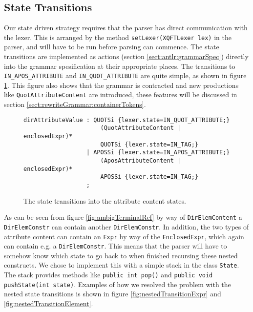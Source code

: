 \subsection{State Transitions}
\label{sect:rewriteGrammar:transitions}
Our state driven strategy requires that the parser has direct communication with the lexer. This is arranged by the method \verb!setLexer(XQFTLexer lex)! in the parser, and will have to be run before parsing can commence. The state transitions are implemented as actions (section \ref{sect:antlr:grammarSpec}) directly into the grammar spesification at their appropriate places. The transitions to \verb!IN_APOS_ATTRIBUTE! and \verb!IN_QUOT_ATTRIBUTE! are quite simple, as shown in figure \ref{fig:transitionSimple}. This figure also shows that the grammar is contracted and new productions like \verb!QuotAttributeContent! are introduced, these features will be discussed in section \ref{sect:rewriteGrammar:containerTokens}.
\begin{figure}[h!]
\begin{verbatim}
dirAttributeValue : QUOTSi {lexer.state=IN_QUOT_ATTRIBUTE;}
                      (QuotAttributeContent | enclosedExpr)* 
                      QUOTSi {lexer.state=IN_TAG;}
                  | APOSSi {lexer.state=IN_APOS_ATTRIBUTE;}
                      (AposAttributeContent | enclosedExpr)* 
                      APOSSi {lexer.state=IN_TAG;}
                  ; 
\end{verbatim}
\caption[Attribute content state transitions.]{The state transitions into the attribute content states.}
\label{fig:transitionSimple}
\end{figure}

As can be seen from figure \ref{fig:ambigTerminalRef} by way of \verb!DirElemContent! a \verb!DirElemConstr! can contain another \verb!DirElemConstr!. In addition, the two types of attribute content can contain an \verb!Expr! by way of the \verb!EnclosedExpr!, which again can contain e.g. a \verb!DirElemConstr!. This means that the parser will have to somehow know which state to go back to when finished recursing these nested constructs. We chose to implement this with a simple stack in the class \verb!State!. The stack provides methods like \verb!public int pop()! and \verb!public void pushState(int state)!. Examples of how we resolved the problem with the nested state transitions is shown in figure \ref{fig:nestedTransitionExpr} and \ref{fig:nestedTransitionElement}.

